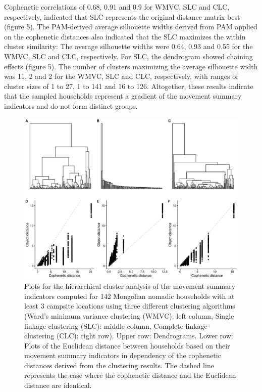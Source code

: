 \documentclass[]{elsarticle} %
\begin{document}
Cophenetic correlations of 0.68, 0.91 and 0.9 for WMVC, SLC and CLC,
respectively, indicated that SLC represents the original distance matrix
best (figure 5). The PAM-derived average silhouette widths derived from
PAM applied on the cophenetic distances also indicated that the SLC
maximizes the within cluster similarity: The average silhouette widths
were 0.64, 0.93 and 0.55 for the WMVC, SLC and CLC, respectively. For
SLC, the dendrogram showed chaining effects (figure 5). The number of
clusters maximizing the average silhouette width was 11, 2 and 2 for the
WMVC, SLC and CLC, respectively, with ranges of cluster sizes of 1 to
27, 1 to 141 and 16 to 126. Altogether, these results indicate that the
sampled households represent a gradient of the movement summary
indicators and do not form distinct groups.

\begin{figure}[H]

{\centering \includegraphics[width=\textwidth]{../figures/si-hc-plots-1} 

}

\caption{Plots for the hierarchical cluster analysis of the movement summary indicators computed for 142 Mongolian nomadic households with at least 3 campsite locations using three different clustering algorithms (Ward's minimum variance clustering (WMVC): left column, Single linkage clustering (SLC): middle column, Complete linkage clustering (CLC): right row). Upper row: Dendrograms. Lower row: Plots of the Euclidean distance between households based on their movement summary indicators in dependency of the cophenetic distances derived from the clustering results. The dashed line represents the case where the cophenetic distance and the Euclidean distance are identical.}\label{fig:si-hc-plots}
\end{figure}
\end{document}
